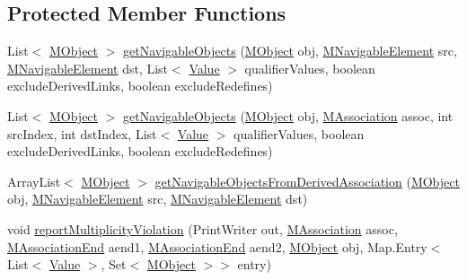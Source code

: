 \subsection*{Protected Member Functions}
\begin{DoxyCompactItemize}
\item 
List$<$ \hyperlink{interfaceorg_1_1tzi_1_1use_1_1uml_1_1sys_1_1_m_object}{M\-Object} $>$ \hyperlink{classorg_1_1tzi_1_1use_1_1uml_1_1sys_1_1_m_system_state_a74436d161ccdc2fc1aba22f0712f6d15}{get\-Navigable\-Objects} (\hyperlink{interfaceorg_1_1tzi_1_1use_1_1uml_1_1sys_1_1_m_object}{M\-Object} obj, \hyperlink{interfaceorg_1_1tzi_1_1use_1_1uml_1_1mm_1_1_m_navigable_element}{M\-Navigable\-Element} src, \hyperlink{interfaceorg_1_1tzi_1_1use_1_1uml_1_1mm_1_1_m_navigable_element}{M\-Navigable\-Element} dst, List$<$ \hyperlink{classorg_1_1tzi_1_1use_1_1uml_1_1ocl_1_1value_1_1_value}{Value} $>$ qualifier\-Values, boolean exclude\-Derived\-Links, boolean exclude\-Redefines)
\item 
List$<$ \hyperlink{interfaceorg_1_1tzi_1_1use_1_1uml_1_1sys_1_1_m_object}{M\-Object} $>$ \hyperlink{classorg_1_1tzi_1_1use_1_1uml_1_1sys_1_1_m_system_state_a0cf8097d85ab33cf344a91387ac16e23}{get\-Navigable\-Objects} (\hyperlink{interfaceorg_1_1tzi_1_1use_1_1uml_1_1sys_1_1_m_object}{M\-Object} obj, \hyperlink{interfaceorg_1_1tzi_1_1use_1_1uml_1_1mm_1_1_m_association}{M\-Association} assoc, int src\-Index, int dst\-Index, List$<$ \hyperlink{classorg_1_1tzi_1_1use_1_1uml_1_1ocl_1_1value_1_1_value}{Value} $>$ qualifier\-Values, boolean exclude\-Derived\-Links, boolean exclude\-Redefines)
\item 
Array\-List$<$ \hyperlink{interfaceorg_1_1tzi_1_1use_1_1uml_1_1sys_1_1_m_object}{M\-Object} $>$ \hyperlink{classorg_1_1tzi_1_1use_1_1uml_1_1sys_1_1_m_system_state_a625756b9979a5903cae02dd4d16514b8}{get\-Navigable\-Objects\-From\-Derived\-Association} (\hyperlink{interfaceorg_1_1tzi_1_1use_1_1uml_1_1sys_1_1_m_object}{M\-Object} obj, \hyperlink{interfaceorg_1_1tzi_1_1use_1_1uml_1_1mm_1_1_m_navigable_element}{M\-Navigable\-Element} src, \hyperlink{interfaceorg_1_1tzi_1_1use_1_1uml_1_1mm_1_1_m_navigable_element}{M\-Navigable\-Element} dst)
\item 
void \hyperlink{classorg_1_1tzi_1_1use_1_1uml_1_1sys_1_1_m_system_state_afd43516cf49082ab0d757eba9b76d037}{report\-Multiplicity\-Violation} (Print\-Writer out, \hyperlink{interfaceorg_1_1tzi_1_1use_1_1uml_1_1mm_1_1_m_association}{M\-Association} assoc, \hyperlink{classorg_1_1tzi_1_1use_1_1uml_1_1mm_1_1_m_association_end}{M\-Association\-End} aend1, \hyperlink{classorg_1_1tzi_1_1use_1_1uml_1_1mm_1_1_m_association_end}{M\-Association\-End} aend2, \hyperlink{interfaceorg_1_1tzi_1_1use_1_1uml_1_1sys_1_1_m_object}{M\-Object} obj, Map.\-Entry$<$ List$<$ \hyperlink{classorg_1_1tzi_1_1use_1_1uml_1_1ocl_1_1value_1_1_value}{Value} $>$, Set$<$ \hyperlink{interfaceorg_1_1tzi_1_1use_1_1uml_1_1sys_1_1_m_object}{M\-Object} $>$$>$ entry)
\end{DoxyCompactItemize}


